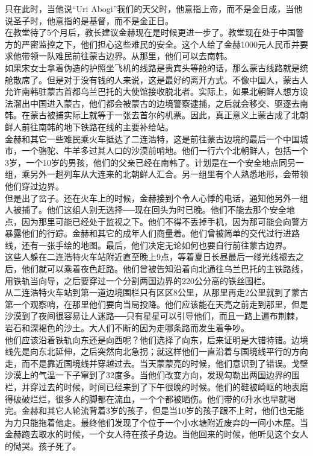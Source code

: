 只在此时，当他说“Uri Abogi”我们的天父时，他意指上帝，而不是金日成，当他说圣子时，他意指的是基督，而不是金正日。\\

在教堂待了5个月后，教长建议金赫现在是时候更进一步了。教堂现在处于中国警方的严密监控之下，他们担心这些难民的安全。这个人给了金赫1000元人民币并要求他带领一队难民前往蒙古边界。从那里，他们可以去南韩。\\

如果宋女士拿着伪造的护照坐飞机的线路是贵宾头等舱的话，那么蒙古线路就是统舱散席了。但是对于没有钱的人来说，这是最好的离开方式。不像中国人，蒙古人允许南韩驻蒙古首都乌兰巴托的大使馆接收脱北者。实际上，如果北朝鲜人想方设法溜出中国进入蒙古，他们都会被蒙古的边境警察逮捕，之后就会移交、驱逐去南韩。在蒙古被捕实际上就等于一张去首尔的机票。因此，真正意义上蒙古成了北朝鲜人前往南韩的地下铁路在线的主要补给站。\\

金赫和其它一些难民乘火车抵达了二连浩特，这是前往蒙古边境的最后一个中国城市，一个骆驼、牛羊多过其人口的沙漠前哨地。他们一行六个北朝鲜人，包括一个3岁，一个10岁的男孩，他们的父亲已经在南韩了。计划是在一个安全地点同另一组，乘另外一趟列车从大连来的北朝鲜人汇合。另一组里有个人熟悉地形，会带领他们穿过边界。\\

但是出了岔子。还在火车上的时候，金赫接到个令人心悸的电话，通知他另外一组人被捕了。他们这组人别无选择──现在回头为时已晚。他们不能去那个安全地点，因为那里可能已经处于监视之下。他们不得不丢掉手机，因为那可能会向警方暴露他们的行踪。金赫和其它的成年人们商量着。他们曾被简单的交代过行进路线，还有一张手绘的地图。最后，他们决定无论如何也要自行前往蒙古边界。\\

这些人躲在二连浩特火车站附近直至晚上9点，等着夏日长昼最后一缕光线褪去之后，他们就可以乘着夜色赶路。他们曾被告知沿着向北通往乌兰巴托的主铁路线，用铁轨当向导，之后要穿过一个分割两国边界的220公分高的铁丝围栏。\\

从二连浩特火车站到第一道边境围栏只有区区8公里，从那里再走2公里就到了蒙古第一个观察哨，在那里他们要向当局投降。他们应该能在天亮之前走到那里，但是沙漠到了夜间很容易让人迷路──只有星星可以引导他们，而且一路上遍布荆棘，岩石和深褐色的沙土。大人们不断的因为走哪条路而发生着争吵。\\

他们应该沿着铁轨向东还是向西呢？他们选择了向东，后来证明是大错特错。边境线先是向东北延伸，之后突然向北急拐；就这样他们一直沿着与国境线平行的方向走，而不是靠近国境线并穿越过去。当天蒙蒙亮的时候，他们意识到了错误。戈壁沙漠上的气温一下子窜到了32度多。当他们改变方向，发现勾勒出两国边界的围栏，并穿过去的时候，时间已经来到了下午很晚的时候。他们的鞋被崎岖的地表磨得破破烂烂，很多人的脚都在流血，一个个都被晒伤。他们带的6升水也早就喝完。金赫和其它人轮流背着3岁的孩子，但是当10岁的孩子跟不上时，他们也无能为力只能拖着他走。最终他们发现了个位于一个小水塘附近废弃的一间小木屋。当金赫跑去取水的时候，一个女人待在孩子身边。当他回来的时候，他听见这个女人的恸哭。孩子死了。\\

